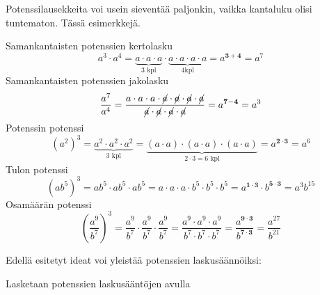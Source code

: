 Potenssilausekkeita voi usein sieventää paljonkin, vaikka kantaluku
olisi tuntematon. Tässä esimerkkejä.    
    
    Samankantaisten potenssien kertolasku
	\[
a^3\cdot a^4=\underbrace{a\cdot a\cdot a}_{\text{3 kpl}}\cdot \underbrace{a\cdot a\cdot a\cdot a}_{\text{4kpl}}=a^{\mathbf{3+4}}=a^7
    	\]
    Samankantaisten potenssien jakolasku
	\[
\frac{a^7}{a^4}=\frac{a\cdot a\cdot a\cdot \cancel{a}\cdot \cancel{a}\cdot \cancel{a}\cdot \cancel{a}}	{\cancel{a}\cdot \cancel{a}\cdot \cancel{a}\cdot \cancel{a}}=a^{\mathbf{7-4}}=a^3
    	\]
    Potenssin potenssi
	\[
(a^2)^3=\underbrace{a^2\cdot a^2\cdot a^2}_{3\text{ kpl}}=
\underbrace{(a\cdot a)\cdot (a\cdot a)\cdot (a\cdot a)}_{2\cdot 3=6\text{ kpl}}=a^{\boldsymbol{{2\cdot 3}}}=a^6
\]
    Tulon potenssi
	\[
(ab^5)^3=ab^5\cdot ab^5\cdot ab^5=a\cdot a\cdot a\cdot b^5\cdot b^5\cdot b^5=a^{\mathbf{1\cdot 3}}\cdot b^{\mathbf{5\cdot 3}}=a^3b^{15}
	\]
     Osamäärän potenssi
	\[
	\left(\frac{a^9}{b^7}\right)^3=\frac{a^9}{b^7}\cdot \frac{a^9}{b^7}\cdot \frac{a^9}{b^7}=\frac{a^9\cdot a^9\cdot a^9}{b^7\cdot b^7\cdot b^7}=\frac{a^{\mathbf{9\cdot 3}}}{b^{\mathbf{7\cdot 3}}}=\frac{a^{27}}{b^{21}}
	\]

 Edellä esitetyt ideat voi yleistää potenssien laskusäännöiksi:
    
 
    \begin{esimerkki}
        Lasketaan potenssien laskusääntöjen avulla
        \begin{alakohdat}
         \end{alakohdat}
    \end{esimerkki} 
 

